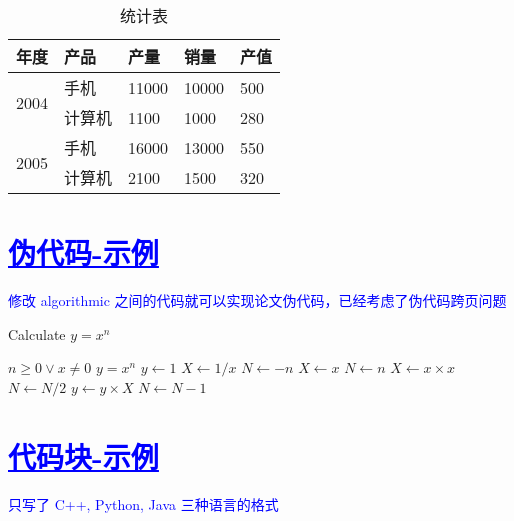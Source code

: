 \begin{table}[htbp]
	\linespread{1.5}
	\songti
	\centering
	\caption{统计表}\label{统计表}
	\begin{tabular}{|l|l|l|l|l|}
		\hline
		年度                    & 产品  & 产量    & 销量    & 产值  \\ \hline
		\multirow{2}{*}{2004} & 手机  & 11000 & 10000 & 500 \\ \cline{2-5} 
		& 计算机 & 1100  & 1000  & 280 \\ \hline
		\multirow{2}{*}{2005} & 手机  & 16000 & 13000 & 550 \\ \cline{2-5} 
		& 计算机 & 2100  & 1500  & 320 \\ \hline
	\end{tabular}
\end{table}


\section{\textcolor{blue}{\underline{\underline{伪代码-示例}}}}

\textcolor{blue}{修改 algorithmic 之间的代码就可以实现论文伪代码，已经考虑了伪代码跨页问题}
\begin{breakablealgorithm}
	\caption{Calculate $y = x^n$}
	\begin{algorithmic}[1] %
		\Require $n \geq 0 \vee x \neq 0$ 
		\Ensure  $y = x^n$
		\State $y \gets 1$
		\State $ X \gets 1 / x$
		\State $N \gets -n$
		\Else
		\State $X \gets x$
		\State $N \gets n$
		\EndIf
		\State $X \gets x \times x$
		\State $N \gets N / 2$
		\Else[$N$ is odd]
		\State $y \gets y \times X$
		\State $N \gets N - 1$
		\EndIf
		\EndWhile
	\end{algorithmic}
\end{breakablealgorithm}

\section{\textcolor{blue}{\underline{\underline{代码块-示例}}}}
\textcolor{blue}{只写了 C++, Python, Java 三种语言的格式}

